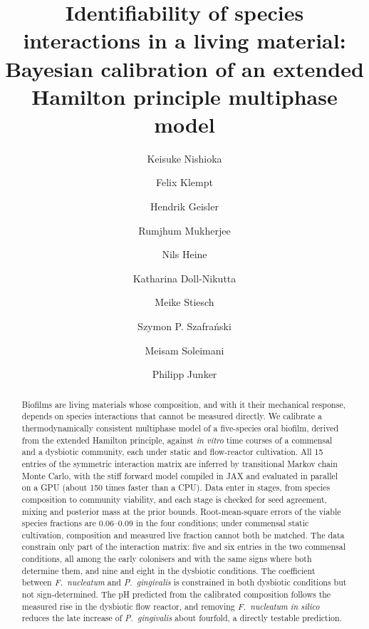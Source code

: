 \documentclass[preprint,12pt]{elsarticle}
\begin{document}
\begin{frontmatter}

\title{Identifiability of species interactions in a living material: Bayesian calibration of an extended Hamilton principle multiphase model}

\author[ikm,mhh,nife,keio]{Keisuke Nishioka}
\author[ikm]{Felix Klempt}
\author[ikm]{Hendrik Geisler}
\author[mhh,nife]{Rumjhum Mukherjee}
\author[mhh,nife]{Nils Heine}
\author[mhh,nife]{Katharina Doll-Nikutta}
\author[mhh,nife]{Meike Stiesch}
\author[mhh,nife]{Szymon P. Szafra\'{n}ski}
\author[ikm]{Meisam Soleimani}
\author[ikm]{Philipp Junker}

\address[ikm]{Institute of Continuum Mechanics, Leibniz Universit\"at Hannover, An der Universit\"at 1, 30823 Garbsen, Germany}
\address[mhh]{Department of Prosthetic Dentistry and Biomedical Materials Science, Hannover Medical School, Carl-Neuberg-Stra\ss{}e 1, 30625 Hannover, Germany}
\address[nife]{Lower Saxony Centre for Biomedical Engineering, Implant Research and Development (NIFE), Stadtfelddamm 34, 30625 Hannover, Germany}
\address[keio]{School of Science for Open and Environmental Systems, Graduate School of Science and Technology, Keio University, 3-14-1 Hiyoshi, Kohoku-ku, Yokohama 223-8522, Japan}

\begin{abstract}
Biofilms are living materials whose composition, and with it their mechanical response, depends on species interactions that cannot be measured directly.
We calibrate a thermodynamically consistent multiphase model of a five-species oral biofilm, derived from the extended Hamilton principle, against \textit{in vitro} time courses of a commensal and a dysbiotic community, each under static and flow-reactor cultivation.
All 15 entries of the symmetric interaction matrix are inferred by transitional Markov chain Monte Carlo, with the stiff forward model compiled in JAX and evaluated in parallel on a GPU (about 150 times faster than a CPU).
Data enter in stages, from species composition to community viability, and each stage is checked for seed agreement, mixing and posterior mass at the prior bounds.
Root-mean-square errors of the viable species fractions are 0.06--0.09 in the four conditions; under commensal static cultivation, composition and measured live fraction cannot both be matched.
The data constrain only part of the interaction matrix: five and six entries in the two commensal conditions, all among the early colonisers and with the same signs where both determine them, and nine and eight in the dysbiotic conditions.
The coefficient between \textit{F.~nucleatum} and \textit{P.~gingivalis} is constrained in both dysbiotic conditions but not sign-determined.
The pH predicted from the calibrated composition follows the measured rise in the dysbiotic flow reactor, and removing \textit{F.~nucleatum} \textit{in silico} reduces the late increase of \textit{P.~gingivalis} about fourfold, a directly testable prediction.
\end{abstract}


\end{frontmatter}
\end{document}
